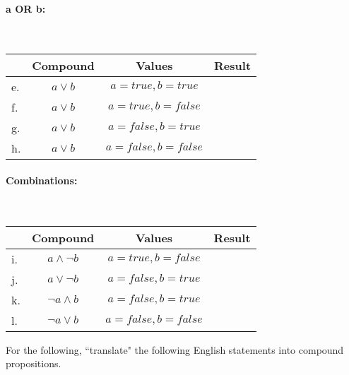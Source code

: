 {        \paragraph{a OR b:} ~\\

        \begin{tabular}{ | l  c | c | p{6cm} | }
            \hline
            & \textbf{Compound} & \textbf{Values} & \textbf{Result}
            \\ \hline

            e. &        $a \lor b$ &       $a = true, b = true$ &     \\ \hline
            f. &        $a \lor b$ &       $a = true, b = false$ &    \\ \hline
            g. &        $a \lor b$ &       $a = false, b = true$ &    \\ \hline
            h. &        $a \lor b$ &       $a = false, b = false$ &   \\ \hline
        \end{tabular}

        \paragraph{Combinations:} ~\\

        \begin{tabular}{ | l  c | c | p{6cm} | }
            \hline
            & \textbf{Compound} & \textbf{Values} & \textbf{Result}
            \\ \hline

            i. &        $a \land \neg b$ &       $a = true, b = false$ &   \\ \hline
            j. &        $a \lor \neg b$ &        $a = false, b = true$ &   \\ \hline

            k. &        $\neg a \land b$ &       $a = false, b = true$ &   \\ \hline
            l. &        $\neg a \lor b$ &        $a = false, b = false$ &  \\ \hline
        \end{tabular}

    \newpage

    \begin{questionNOGRADE}{\thequestion}
        For the following, ``translate" the following English statements
        into compound propositions.


\end{questionNOGRADE}}

